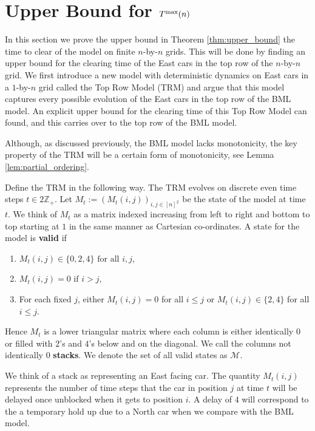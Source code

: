 \documentclass[reqno]{amsart}
\begin{document}
\section{Upper Bound for $T^{\text{\rm max}}(n)$}

In this section we prove the upper bound in Theorem \ref{thm:upper_bound} the time to clear of the model on finite $n$-by-$ n$ grids. This will be done by finding an upper bound for the clearing time of the East cars in the top row of the $n$-by-$ n$ grid. We first introduce a new model with deterministic dynamics on East cars in a $1 $-by-$ n$ grid called the Top Row Model (TRM) and argue that this model captures every possible evolution of the East cars in the top row of the BML model. An explicit upper bound for the clearing time of this Top Row Model can found, and this carries over to the top row of the BML model.

Although, as discussed previously, the BML model lacks monotonicity, the key property of the TRM will be a certain form of monotonicity, see Lemma \ref{lem:partial_ordering}.

Define the TRM in the following way. The TRM evolves on discrete even time steps $t \in 2 \mathbb{Z_+}$. Let $M_t:=(M_t(i,j))_{i,j \in [n]^2}$ be the state of the model at time $t$. We think of $M_t$ as a matrix indexed increasing from left to right and bottom to top starting at $1$ in the same manner as Cartesian co-ordinates. A state for the model is \textbf{valid} if
\begin{enumerate}
    \item $M_t(i,j) \in \{0,2,4\} \text{ for all } i,j$,
    \item $M_t(i,j) = 0 \text{ if } i> j$,
    \item For each fixed $j$, either $M_t(i,j) = 0$ for all $i \leq j$ or $M_t(i,j) \in \{2,4\}$ for all $i \leq j$.
\end{enumerate}
Hence $M_t$ is a lower triangular matrix where each column is either identically $0$ or filled with $2$'s and $4$'s below and on the diagonal. We call the columns not identically $0$ \textbf{stacks}. We denote the set of all valid states as $\mathcal{M}$.

We think of a stack as representing an East facing car. The quantity $M_t(i,j)$ represents the number of time steps that the car in position $j$ at time $t$ will be delayed once unblocked when it gets to position $i$. A delay of $4$ will correspond to the a temporary hold up due to a North car when we compare with the BML model. 
\end{document}
